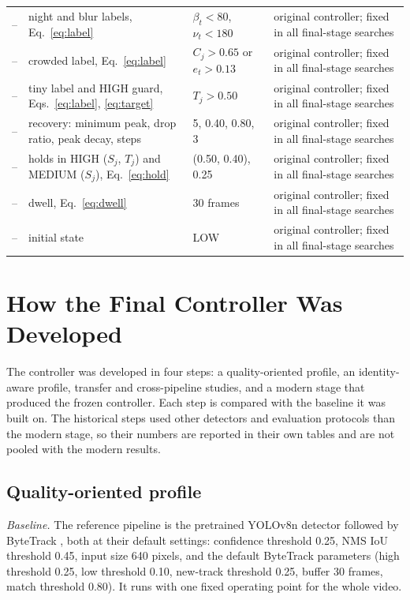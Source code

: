 \documentclass[pdflatex,sn-mathphys-num,iicol]{sn-jnl}
\begin{document}
\begin{table}[t]
\begin{tabular}{@{}l>{\raggedright\arraybackslash}p{50mm}l>{\raggedright\arraybackslash}p{62mm}@{}}
-- & night and blur labels, Eq.~\eqref{eq:label} & $\beta_t<80$, $\nu_t<180$ & original controller; fixed in all final-stage searches\\
-- & crowded label, Eq.~\eqref{eq:label} & $C_j>0.65$ or $e_t>0.13$ & original controller; fixed in all final-stage searches\\
-- & tiny label and HIGH guard, Eqs.~\eqref{eq:label}, \eqref{eq:target} & $T_j>0.50$ & original controller; fixed in all final-stage searches\\
-- & recovery: minimum peak, drop ratio, peak decay, steps & 5, 0.40, 0.80, 3 & original controller; fixed in all final-stage searches\\
-- & holds in HIGH ($S_j$, $T_j$) and MEDIUM ($S_j$), Eq.~\eqref{eq:hold} & (0.50, 0.40), 0.25 & original controller; fixed in all final-stage searches\\
-- & dwell, Eq.~\eqref{eq:dwell} & 30 frames & original controller; fixed in all final-stage searches\\
-- & initial state & LOW & original controller; fixed in all final-stage searches\\
\bottomrule
\end{tabular}
\end{table}
\section{How the Final Controller Was Developed}\label{sec:development}

The controller was developed in four steps: a quality-oriented profile, an
identity-aware profile, transfer and cross-pipeline studies, and a modern
stage that produced the frozen controller. Each step is compared with the
baseline it was built on. The historical steps used other detectors and
evaluation protocols than the modern stage, so their numbers are reported in
their own tables and are not pooled with the modern results.

\subsection{Quality-oriented profile}\label{sec:quality}

\emph{Baseline.} The reference pipeline is the pretrained YOLOv8n detector
\cite{jocher2023yolov8} followed by ByteTrack \cite{zhang2022bytetrack}, both at
their default settings: confidence threshold 0.25, NMS IoU threshold 0.45,
input size 640 pixels, and the default ByteTrack parameters (high threshold
0.25, low threshold 0.10, new-track threshold 0.25, buffer 30 frames, match
threshold 0.80). It runs with one fixed operating point for the whole video.
\end{document}
